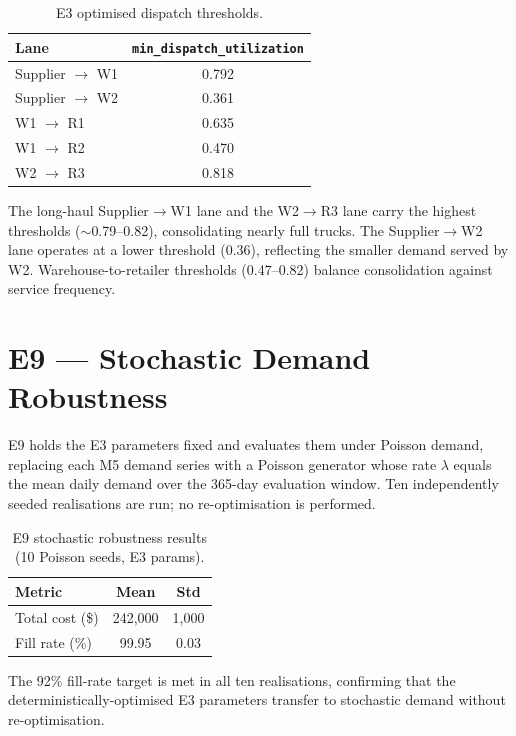 \begin{table}[H]
  \centering
  \caption{E3 optimised dispatch thresholds.}
  \begin{tabular}{@{}lc@{}}
    \toprule
    Lane & \texttt{min\_dispatch\_utilization} \\
    \midrule
    Supplier $\to$ W1 & 0.792 \\
    Supplier $\to$ W2 & 0.361 \\
    W1 $\to$ R1       & 0.635 \\
    W1 $\to$ R2       & 0.470 \\
    W2 $\to$ R3       & 0.818 \\
    \bottomrule
  \end{tabular}
\end{table}

The long-haul Supplier$\to$W1 lane and the W2$\to$R3 lane carry the
highest thresholds ($\sim$0.79--0.82), consolidating nearly full trucks.
The Supplier$\to$W2 lane operates at a lower threshold (0.36), reflecting
the smaller demand served by W2.  Warehouse-to-retailer thresholds
(0.47--0.82) balance consolidation against service frequency.

\section*{E9 --- Stochastic Demand Robustness}

E9 holds the E3 parameters fixed and evaluates them under Poisson demand,
replacing each M5 demand series with a Poisson generator whose rate
$\lambda$ equals the mean daily demand over the 365-day evaluation window.
Ten independently seeded realisations are run; no re-optimisation is
performed.

\begin{table}[H]
  \centering
  \caption{E9 stochastic robustness results (10 Poisson seeds, E3 params).}
  \begin{tabular}{@{}lcc@{}}
    \toprule
    Metric & Mean & Std \\
    \midrule
    Total cost (\$) & 242{,}000 & 1{,}000 \\
    Fill rate (\%)  & 99.95     & 0.03    \\
    \bottomrule
  \end{tabular}
\end{table}

The 92\% fill-rate target is met in all ten realisations, confirming that
the deterministically-optimised E3 parameters transfer to stochastic demand
without re-optimisation.

